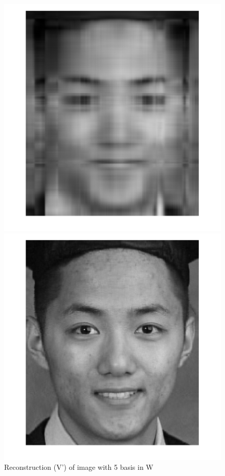 \documentclass[11pt]{article} %
\begin{document}
\begin{figure}[H]
  \includegraphics[width=\linewidth]{mySelfie50M5R.png}
  \caption{Reconstruction (V') of image with 5 basis in W}\label{fig:awesome_image1}
\endminipage\hfill
{}
  \includegraphics[width=\linewidth]{mySelfie50M100R.png}

\end{figure}
\end{document}

